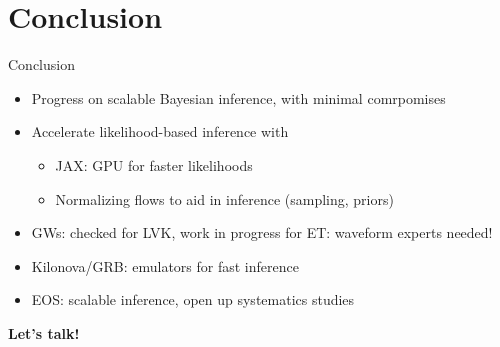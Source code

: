 \documentclass[usenames,dvipsnames,t]{beamer}
\begin{document}
\section{Conclusion}

\begin{frame}{Conclusion}
  \def\x{4mm}
  \def\y{1mm}

  \begin{itemize}
    \item Progress on scalable Bayesian inference, with minimal comrpomises
 
    \vspace{\x}

    \item Accelerate likelihood-based inference with
    \begin{itemize}
      \vspace{\y}
      \item \textsc{JAX}: GPU for faster likelihoods

      \vspace{\y}

      \item Normalizing flows to aid in inference (sampling, priors)
    \end{itemize}

    \vspace{\x}

    \item GWs: checked for LVK, work in progress for ET: waveform experts needed!

    \vspace{\x}

    \item Kilonova/GRB: emulators for fast inference

    \vspace{\x}

    \item EOS: scalable inference, open up systematics studies
  \end{itemize}
  
  \vspace{8mm}

  \textbf{Let's talk!}
\end{frame}
\end{document}
